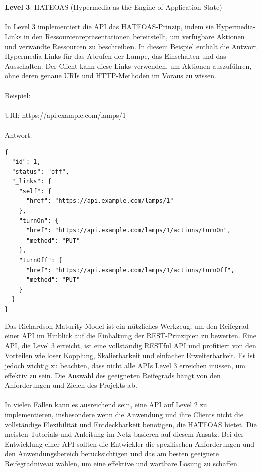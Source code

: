 \documentclass[../vs-script-first-v01.tex]{subfiles}
\begin{document}
\\\\
\textbf{Level 3}: HATEOAS (Hypermedia as the Engine of Application State)
\\\\
In Level 3 implementiert die API das HATEOAS-Prinzip, indem sie Hypermedia-Links in den Ressourcenrepräsentationen bereitstellt, um verfügbare Aktionen und verwandte Ressourcen zu beschreiben. In diesem Beispiel enthält die Antwort Hypermedia-Links für das Abrufen der Lampe, das Einschalten und das Ausschalten. Der Client kann diese Links verwenden, um Aktionen auszuführen, ohne deren genaue URIs und HTTP-Methoden im Voraus zu wissen.
\\\\
Beispiel:
\\\\
URI: https://api.example.com/lamps/1
\\\\
Antwort:\\
\begin{lstlisting}[caption={Level 3 (HATEOAS)},captionpos=b,label={lst:level_3}]
{
  "id": 1,
  "status": "off",
  "_links": {
    "self": {
      "href": "https://api.example.com/lamps/1"
    },
    "turnOn": {
      "href": "https://api.example.com/lamps/1/actions/turnOn",
      "method": "PUT"
    },
    "turnOff": {
      "href": "https://api.example.com/lamps/1/actions/turnOff",
      "method": "PUT"
    }
  }
}
\end{lstlisting}

Das Richardson Maturity Model ist ein nützliches Werkzeug, um den Reifegrad einer API im Hinblick auf die Einhaltung der REST-Prinzipien zu bewerten. Eine API, die Level 3 erreicht, ist eine vollständig RESTful API und profitiert von den Vorteilen wie loser Kopplung, Skalierbarkeit und einfacher Erweiterbarkeit. Es ist jedoch wichtig zu beachten, dass nicht alle APIs Level 3 erreichen müssen, um effektiv zu sein. Die Auswahl des geeigneten Reifegrads hängt von den Anforderungen und Zielen des Projekts ab.
\\\\
In vielen Fällen kann es ausreichend sein, eine API auf Level 2 zu implementieren, insbesondere wenn die Anwendung und ihre Clients nicht die vollständige Flexibilität und Entdeckbarkeit benötigen, die HATEOAS bietet. Die meisten Tutorials und Anleitung im Netz basieren auf diesem Ansatz. Bei der Entwicklung einer API sollten die Entwickler die spezifischen Anforderungen und den Anwendungsbereich berücksichtigen und das am besten geeignete Reifegradniveau wählen, um eine effektive und wartbare Lösung zu schaffen.
\end{document}
